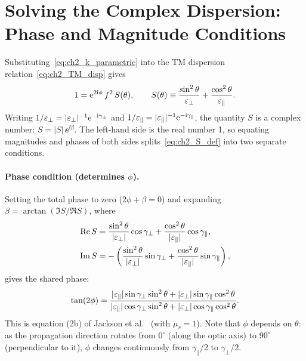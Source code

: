 \section{Solving the Complex Dispersion: Phase and Magnitude Conditions}

Substituting~\eqref{eq:ch2_k_parametric} into the TM dispersion
relation~\eqref{eq:ch2_TM_disp} gives
\begin{equation}
  1 = \mathrm{e}^{2\mathrm{i}\phi}\,f^2\,S(\theta), \qquad
  S(\theta) \equiv \frac{\sin^2\theta}{\varepsilon_{\perp}} + \frac{\cos^2\theta}{\varepsilon_{\parallel}}.
  \label{eq:ch2_S_def}
\end{equation}
Writing $1/\varepsilon_{\perp} = |\varepsilon_{\perp}|^{-1}\mathrm{e}^{-\mathrm{i}\gamma_\perp}$ and
$1/\varepsilon_{\parallel} = |\varepsilon_{\parallel}|^{-1}\mathrm{e}^{-\mathrm{i}\gamma_\parallel}$, the quantity $S$ is
a complex number: $S = |S|\,\ee^{\ii\beta}$. The left-hand side is the real
number 1, so equating magnitudes and phases of both sides
splits~\eqref{eq:ch2_S_def} into two separate conditions.

\paragraph{Phase condition (determines $\phi$).}
Setting the total phase to zero ($2\phi + \beta = 0$) and expanding
$\beta = \arctan(\Im S / \Re S)$, where
\begin{align}
  \operatorname{Re} S &= \frac{\sin^2\theta}{|\varepsilon_{\perp}|}\cos\gamma_\perp
         + \frac{\cos^2\theta}{|\varepsilon_{\parallel}|}\cos\gamma_\parallel, \\
  \operatorname{Im} S &= -\left(\frac{\sin^2\theta}{|\varepsilon_{\perp}|}\sin\gamma_\perp
         + \frac{\cos^2\theta}{|\varepsilon_{\parallel}|}\sin\gamma_\parallel\right),
\end{align}
gives the shared phase:
\begin{equation}
  \tan(2\phi) = \frac{|\varepsilon_{\parallel}|\sin\gamma_\perp\sin^2\theta
                    + |\varepsilon_{\perp}|\sin\gamma_\parallel\cos^2\theta}
                     {|\varepsilon_{\parallel}|\cos\gamma_\perp\sin^2\theta
                    + |\varepsilon_{\perp}|\cos\gamma_\parallel\cos^2\theta}.
  \label{eq:ch2_phase_condition}
\end{equation}
This is equation (2b) of Jackson et al.~\cite{jackson2024} (with $\mu_r = 1$).
Note that $\phi$ depends on $\theta$: as the propagation direction rotates
from $0^\circ$ (along the optic axis) to $90^\circ$ (perpendicular to it),
$\phi$ changes continuously from $\gamma_\parallel/2$ to $\gamma_\perp/2$.

